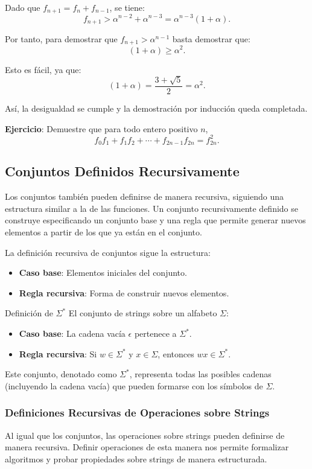 Dado que $f_{n+1} = f_n + f_{n-1}$, se tiene:
\[
    f_{n+1} > \alpha^{n-2} + \alpha^{n-3} = \alpha^{n-3} (1 + \alpha).
\]

Por tanto, para demostrar que $f_{n+1} > \alpha^{n-1}$ basta demostrar que:
\[
    (1 + \alpha) \geq \alpha^2.
\]

Esto es fácil, ya que:
\[
    (1 + \alpha) = \frac{3 + \sqrt{5}}{2} = \alpha^2.
\]

Así, la desigualdad se cumple y la demostración por inducción queda completada.

\bigskip
\noindent \textbf{Ejercicio}: Demuestre que para todo entero positivo $n$, 
 $$ f_0 f_1 + f_1 f_2 + \cdots + f_{2n-1} f_{2n} = f_{2n}^2. $$


\subsection{Conjuntos Definidos Recursivamente}
Los conjuntos también pueden definirse de manera recursiva, siguiendo una estructura similar a la de las funciones. Un conjunto recursivamente definido se construye especificando un conjunto base y una regla que permite generar nuevos elementos a partir de los que ya están en el conjunto.

La definición recursiva de conjuntos sigue la estructura:
\begin{itemize}
    \item \textbf{Caso base}: Elementos iniciales del conjunto.
    \item \textbf{Regla recursiva}: Forma de construir nuevos elementos.
\end{itemize}

\begin{exampleblock} {Definición de $\Sigma^*$} 
El conjunto de strings sobre un alfabeto $\Sigma$:
\begin{itemize}
    \item \textbf{Caso base}: La cadena vacía $\epsilon$ pertenece a $\Sigma^*$.
    \item \textbf{Regla recursiva}: Si $w \in \Sigma^*$ y $x \in \Sigma$, entonces $wx \in \Sigma^*$.
\end{itemize}
\end{exampleblock}
Este conjunto, denotado como $\Sigma^*$, representa todas las posibles cadenas (incluyendo la cadena vacía) que pueden formarse con los símbolos de $\Sigma$.

\subsubsection{Definiciones Recursivas de Operaciones sobre Strings}
Al igual que los conjuntos, las operaciones sobre strings pueden definirse de manera recursiva. Definir operaciones de esta manera nos permite formalizar algoritmos y probar propiedades sobre strings de manera estructurada.

